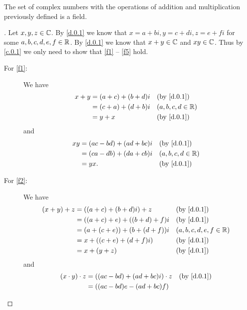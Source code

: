\begin{thm}\label{d.1}
  The set of complex numbers with the operations of addition and multiplication previously defined is a field.
\end{thm}

\begin{proof}[]
  Let \(x, y, z \in \mathbb{C}\).
  By \cref{d.0.1} we know that \(x = a + bi, y = c + di, z = e + fi\) for some \(a, b, c, d, e, f \in \mathbb{R}\).
  By \cref{d.0.1} we know that \(x + y \in \mathbb{C}\) and \(xy \in \mathbb{C}\).
  Thus by \cref{c.0.1} we only need to show that \ref{f1} -- \ref{f5} hold.
  \begin{description}
    \item[For \ref{f1}:]
      We have
      \begin{align*}
        x + y & = (a + c) + (b + d) i &  & \by{d.0.1}          \\
              & = (c + a) + (d + b) i &  & (a, b, c, d \in \R) \\
              & = y + x               &  & \by{d.0.1}
      \end{align*}
      and
      \begin{align*}
        xy & = (ac - bd) + (ad + bc) i &  & \by{d.0.1}          \\
           & = (ca - db) + (da + cb) i &  & (a, b, c, d \in \R) \\
           & = yx.                     &  & \by{d.0.1}
      \end{align*}
    \item[For \ref{f2}:]
      We have
      \begin{align*}
        (x + y) + z & = ((a + c) + (b + d)i) + z        &  & \by{d.0.1}                \\
                    & = ((a + c) + e) + ((b + d) + f) i &  & \by{d.0.1}                \\
                    & = (a + (c + e)) + (b + (d + f)) i &  & (a, b, c, d, e, f \in \R) \\
                    & = x + ((c + e) + (d + f)i)        &  & \by{d.0.1}                \\
                    & = x + (y + z)                     &  & \by{d.0.1}
      \end{align*}
      and
      \begin{align*}
        (x \cdot y) \cdot z & = ((ac - bd) + (ad + bc) i) \cdot z   &  & \by{d.0.1}                \\
                            & = ((ac - bd) e - (ad + bc) f)                                        \\

\end{align*}
\end{description}
\end{proof}
